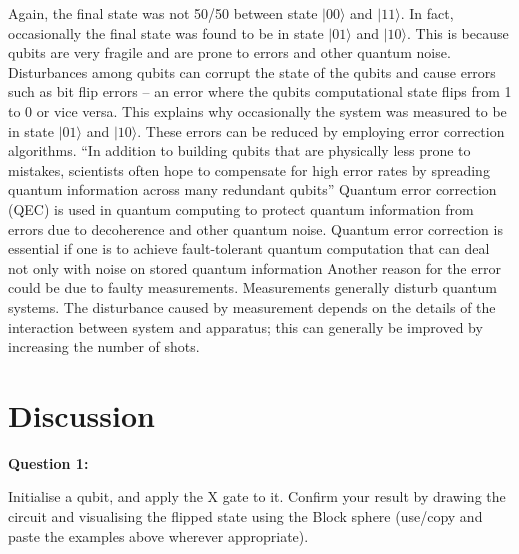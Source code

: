 Again, the final state was not 50/50 between state $|00\rangle$ and $|11\rangle$. In fact, occasionally the final state was found to be in state $|01\rangle$ and $|10\rangle$. This is because qubits are very fragile and are prone to errors and other quantum noise.%
Disturbances among qubits can corrupt the state of the qubits and cause errors such as bit flip errors -- an error where the qubits computational state flips from 1 to 0 or vice versa. This explains why occasionally the system was measured to be in state $|01\rangle$ and $|10\rangle$. These errors can be reduced by employing error correction algorithms.
``In addition to building qubits that are physically less prone to mistakes, scientists often hope to compensate for high error rates by spreading quantum information across many redundant qubits''
Quantum error correction (QEC) is used in quantum computing to protect quantum information from errors due to decoherence and other quantum noise. Quantum error correction is essential if one is to achieve fault-tolerant quantum computation that can deal not only with noise on stored quantum information%
Another reason for the error could be due to faulty measurements. Measurements generally disturb quantum systems.%
The disturbance caused by measurement depends on the details of the interaction between system and apparatus; this can generally be improved by increasing the number of shots.


\section{Discussion} \label{sec:discussion}
\textbf{Question 1:}

Initialise a qubit, and apply the X gate to it. Confirm your result by drawing the circuit and visualising the flipped state using the Block sphere (use/copy and paste the examples above wherever appropriate).


